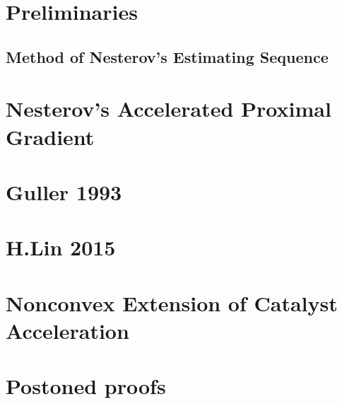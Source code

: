 \documentclass[12pt]{article}
\begin{document}
\section{Preliminaries}\label{sec:preliminaries}

    \subsection{Method of Nesterov's Estimating Sequence}

\section{Nesterov's Accelerated Proximal Gradient}

\section{Guller 1993}
\section{H.Lin 2015}

\section{Nonconvex Extension of Catalyst Acceleration}





\appendix
\section{Postoned proofs}

    
    
\end{document}
